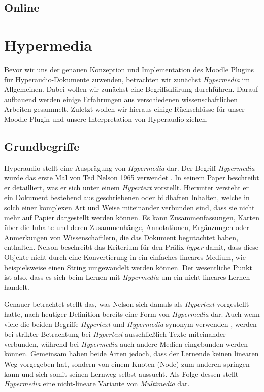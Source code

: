 \subsection{Online}

\citep{dillenbourg1999collaborative}


\section{Hypermedia}
Bevor wir uns der genauen Konzeption und Implementation des Moodle Plugins für Hyperaudio-Dokumente zuwenden, betrachten wir zunächst \textit{Hypermedia} im Allgemeinen. Dabei wollen wir zunächst eine Begriffsklärung durchführen. Darauf aufbauend werden einige Erfahrungen aus verschiedenen wissenschaftlichen Arbeiten gesammelt. Zuletzt wollen wir hieraus einige Rückschlüsse für unser Moodle Plugin und unsere Interpretation von Hyperaudio ziehen.


\subsection{Grundbegriffe}
Hyperaudio stellt eine Ausprägung von \textit{Hypermedia} dar. Der Begriff \textit{Hypermedia} wurde das erste Mal von Ted Nelson 1965 verwendet \citep{nelson1965complex}. In seinem Paper beschreibt er detailliert, was er sich unter einem \textit{Hypertext} vorstellt. Hierunter versteht er ein Dokument bestehend aus geschriebenen oder bildhaften Inhalten, welche in solch einer komplexen Art und Weise miteinander verbunden sind, dass sie nicht mehr auf Papier dargestellt werden können. Es kann Zusammenfassungen, Karten über die Inhalte und deren Zusammenhänge, Annotationen, Ergänzungen oder Anmerkungen von Wissenschaftlern, die das Dokument begutachtet haben, enthalten. Nelson beschreibt das Kriterium für den Präfix \textit{hyper} damit, dass diese Objekte nicht durch eine Konvertierung in ein einfaches lineares Medium, wie beispielsweise einen String umgewandelt werden können. Der wesentliche Punkt ist also, dass es sich beim Lernen mit \textit{Hypermedia} um ein nicht-lineares Lernen handelt.

Genauer betrachtet stellt das, was Nelson sich damals als \textit{Hypertext} vorgestellt hatte, nach heutiger Definition bereits eine Form von \textit{Hypermedia} dar. Auch wenn viele die beiden Begriffe \textit{Hypertext} und \textit{Hypermedia} synonym verwenden \citep{nielsen2013multimedia}, werden bei strikter Betrachtung bei \textit{Hypertext} ausschließlich Texte miteinander verbunden, während bei \textit{Hypermedia} auch andere Medien eingebunden werden können. Gemeinsam haben beide Arten jedoch, dass der Lernende keinen linearen Weg vorgegeben hat, sondern von einem Knoten (Node) zum anderen springen kann und sich somit seinen Lernweg selbst aussucht. Als Folge dessen stellt \textit{Hypermedia} eine nicht-lineare Variante von \textit{Multimedia} dar.

